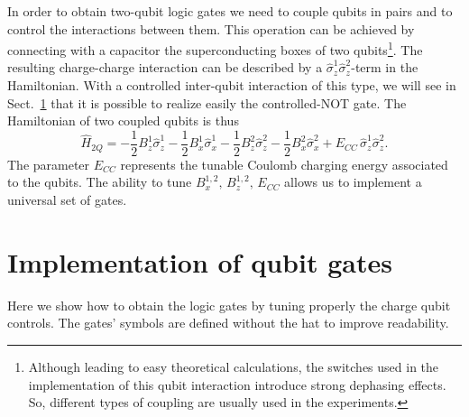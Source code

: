 \documentclass[../main/main.tex]{subfiles}
\begin{document}
In order to obtain two-qubit logic gates we need to couple qubits in pairs and to control the interactions between them. This operation can be achieved by connecting with a capacitor the superconducting boxes of two qubits\footnote{Although leading to easy theoretical calculations, the switches used in the implementation of this qubit interaction introduce strong dephasing effects. So, different types of coupling are usually used in the experiments.}. The resulting charge-charge interaction can be described by a $\hat{\sigma}_z^1 \hat{\sigma}_z^2$-term in the Hamiltonian. With a controlled inter-qubit interaction of this type, we will see in Sect.~\ref{sect:implementation_qubit_gates} that it is possible to realize easily the controlled-NOT gate. The Hamiltonian of two coupled qubits is thus
\begin{equation} \label{eq:Hamiltonian_2_charge_qubits_halfspin}
    \hat{H}_{2Q} = -\frac{1}{2} B_z^1 \hat{\sigma}_z^1 -\frac{1}{2} B_x^1 \hat{\sigma}_x^1 -\frac{1}{2} B_z^2 \hat{\sigma}_z^2 -\frac{1}{2} B_x^2 \hat{\sigma}_x^2 + E_{CC}\, \hat{\sigma}_z^1 \hat{\sigma}_z^2 .
\end{equation}
The parameter $E_{CC}$ represents the tunable Coulomb charging energy associated to the qubits. The ability to tune $B_x^{1,2},\,B_z^{1,2},\,E_{CC}$ allows us to implement a universal set of gates.
\section{Implementation of qubit gates} \label{sect:implementation_qubit_gates}
Here we show how to obtain the logic gates by tuning properly the charge qubit controls. The gates' symbols are defined without the hat to improve readability.
\end{document}

